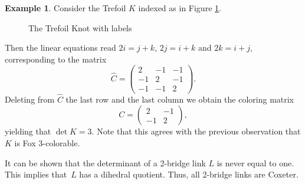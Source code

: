 \documentclass{article}
\newtheorem{theorem}{Theorem}[section]
\theoremstyle{definition}
\newtheorem{example}[theorem]{Example}
\begin{document}
\begin{example}
Consider the Trefoil $K$ indexed as in Figure \ref{fig:trefoil-labeled-for-coloring}.
\begin{figure}[ht]
\centering
{}
\caption{The Trefoil Knot with labels}
\label{fig:trefoil-labeled-for-coloring}
\end{figure}

Then the linear equations read $2i = j + k$, $2j = i + k$ and $2k = i + j$, corresponding to the matrix
$$\widehat{C} = \left(\begin{matrix}
2 & -1 & -1 \\
-1 & 2 & -1 \\
-1 & -1 & 2
\end{matrix}\right).$$
Deleting from $\widehat{C}$ the last row and the last column we obtain the coloring matrix
$$C = \left( \begin{matrix}
2 & -1 \\
-1 & 2
\end{matrix} \right),$$
yielding that $\det K = 3$. Note that this agrees with the previous observation that $K$ is Fox $3$-colorable.
\end{example}

It can be shown that the determinant of a 2-bridge link $L$ is never equal to one. This implies that~$L$ has a dihedral quotient. Thus, all 2-bridge links are Coxeter.


\end{document}
